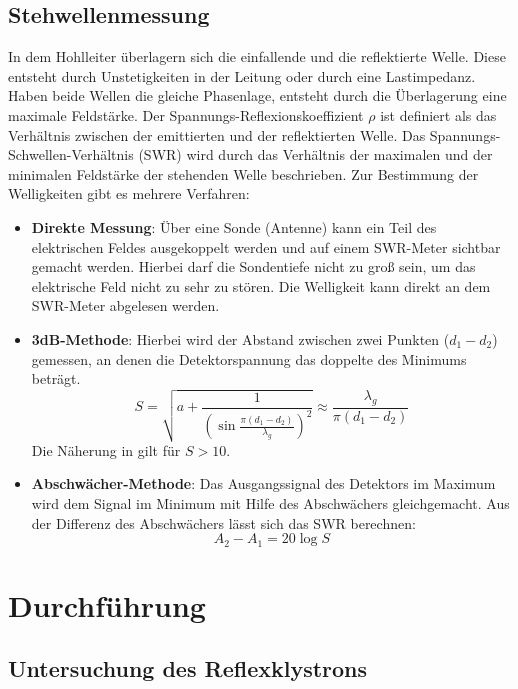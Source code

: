 \subsection{Stehwellenmessung}
In dem Hohlleiter überlagern sich die einfallende und die reflektierte Welle.
Diese entsteht durch Unstetigkeiten in der Leitung oder durch eine Lastimpedanz.
Haben beide Wellen die gleiche Phasenlage, entsteht durch die Überlagerung eine
maximale Feldstärke.
Der Spannungs-Reflexionskoeffizient $\rho$ ist definiert als das Verhältnis
zwischen der emittierten und der reflektierten Welle.
Das Spannungs-Schwellen-Verhältnis (SWR) wird durch das Verhältnis der
maximalen und der minimalen Feldstärke der stehenden Welle beschrieben.
Zur Bestimmung der Welligkeiten gibt es mehrere Verfahren:
\begin{itemize}
  \item \textbf{Direkte Messung}: Über eine Sonde (Antenne) kann ein Teil des
  elektrischen Feldes ausgekoppelt werden und auf einem SWR-Meter sichtbar
  gemacht werden. Hierbei darf die Sondentiefe nicht zu groß sein, um das
  elektrische Feld nicht zu sehr zu stören. Die Welligkeit kann direkt an
  dem SWR-Meter abgelesen werden.
  \item \textbf{3dB-Methode}: Hierbei wird der Abstand zwischen zwei Punkten ($d_1-d_2$)
  gemessen, an denen die Detektorspannung das doppelte des Minimums beträgt.
  \begin{equation}
    S= \sqrt{a+\frac{1}{\left(\sin{\frac{\pi(d_1-d_2)}{\lambda_g}}\right)^2}}
    \approx \frac{\lambda_g}{\pi (d_1-d_2)}
    \label{eq:3dB}
  \end{equation}
  Die Näherung in gilt für $S>10$.
  \item \textbf{Abschwächer-Methode}: Das Ausgangssignal des Detektors im Maximum
  wird dem Signal im Minimum mit Hilfe des Abschwächers gleichgemacht. Aus der
  Differenz des Abschwächers lässt sich das SWR berechnen:
  \begin{equation}
    A_2-A_1 = 20 \log{S}
    \label{eq:Abschwaechermethode}
  \end{equation}
\end{itemize}

\section{Durchführung}

\subsection{Untersuchung des Reflexklystrons}


